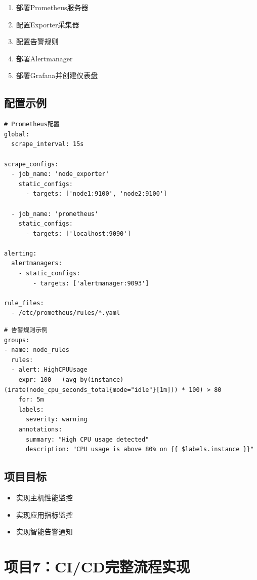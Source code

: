 \documentclass[12pt,UTF8]{ctexbook}
\begin{document}
\begin{enumerate}
    \item 部署Prometheus服务器
    \item 配置Exporter采集器
    \item 配置告警规则
    \item 部署Alertmanager
    \item 部署Grafana并创建仪表盘
\end{enumerate}

\subsection*{配置示例}

\begin{lstlisting}
# Prometheus配置
global:
  scrape_interval: 15s

scrape_configs:
  - job_name: 'node_exporter'
    static_configs:
      - targets: ['node1:9100', 'node2:9100']
  
  - job_name: 'prometheus'
    static_configs:
      - targets: ['localhost:9090']

alerting:
  alertmanagers:
    - static_configs:
        - targets: ['alertmanager:9093']

rule_files:
  - /etc/prometheus/rules/*.yaml
\end{lstlisting}

\begin{lstlisting}
# 告警规则示例
groups:
- name: node_rules
  rules:
  - alert: HighCPUUsage
    expr: 100 - (avg by(instance) (irate(node_cpu_seconds_total{mode="idle"}[1m])) * 100) > 80
    for: 5m
    labels:
      severity: warning
    annotations:
      summary: "High CPU usage detected"
      description: "CPU usage is above 80% on {{ $labels.instance }}"
\end{lstlisting}

\subsection*{项目目标}

\begin{itemize}
    \item 实现主机性能监控
    \item 实现应用指标监控
    \item 实现智能告警通知
\end{itemize}

\section{项目7：CI/CD完整流程实现}
\label{sec:project-cicd}
\end{document}
